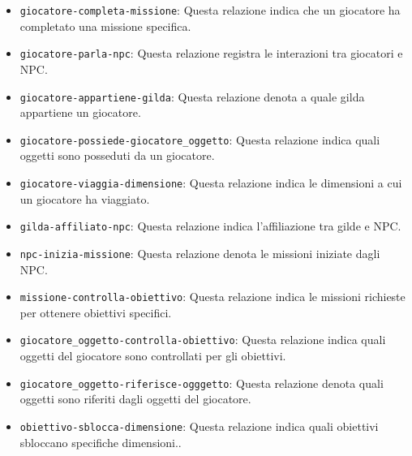 \documentclass{article}
\begin{document}
\begin{itemize}
    \item \lstinline|giocatore-completa-missione|: Questa relazione indica che un giocatore ha completato una missione specifica.
    \item \lstinline|giocatore-parla-npc|: Questa relazione registra le interazioni tra giocatori e NPC.
    \item \lstinline|giocatore-appartiene-gilda|: Questa relazione denota a quale gilda appartiene un giocatore.
    \item \lstinline|giocatore-possiede-giocatore_oggetto|: Questa relazione indica quali oggetti sono posseduti da un giocatore.
    \item \lstinline|giocatore-viaggia-dimensione|: Questa relazione indica le dimensioni a cui un giocatore ha viaggiato.
    \item \lstinline|gilda-affiliato-npc|: Questa relazione indica l'affiliazione tra gilde e NPC.
    \item \lstinline|npc-inizia-missione|: Questa relazione denota le missioni iniziate dagli NPC.
    \item \lstinline|missione-controlla-obiettivo|: Questa relazione indica le missioni richieste per ottenere obiettivi specifici.
    \item \lstinline|giocatore_oggetto-controlla-obiettivo|: Questa relazione indica quali oggetti del giocatore sono controllati per gli obiettivi.
    \item \lstinline|giocatore_oggetto-riferisce-ogggetto|: Questa relazione denota quali oggetti sono riferiti dagli oggetti del giocatore.
    \item \lstinline|obiettivo-sblocca-dimensione|: Questa relazione indica quali obiettivi sbloccano specifiche dimensioni..
\end{itemize}
\end{document}
